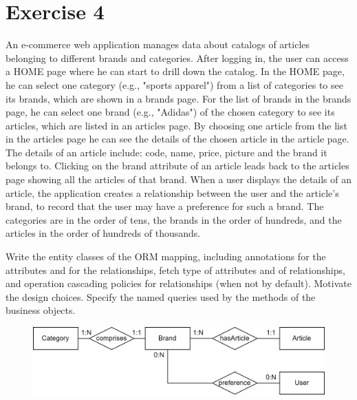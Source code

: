 \section{Exercise 4}

An e-commerce web application manages data about catalogs of articles belonging to different brands and categories. 
After logging in, the user can access a HOME page where he can start to drill down the catalog. 
In the HOME page, he can select one category (e.g., "sports apparel") from a list of categories to see its brands, which are shown in a brands page. 
For the list of brands in the brands page, he can select one brand (e.g., "Adidas") of the chosen category to see its articles, which are listed in an articles page.
By choosing one article from the list in the articles page he can see the details of the chosen article in the article page. 
The details of an article include: code, name, price, picture and the brand it belongs to.
Clicking on the brand attribute of an article leads back to the articles page showing all the articles of that brand. 
When a user displays the details of an article, the application creates a relationship between the user and the article's brand, to record that the user may have a preference for such a brand.
The categories are in the order of tens, the brands in the order of hundreds, and the articles in the order of hundreds of thousands. 

Write the entity classes of the ORM mapping, including annotations for the attributes and for the relationships, fetch type of attributes and of relationships, and operation cascading policies for relationships (when not by default). 
Motivate the design choices. 
Specify the named queries used by the methods of the business objects.
\begin{figure}[H]
    \centering
    \includegraphics[width=0.75\linewidth]{images/jpa1.png}
\end{figure}

